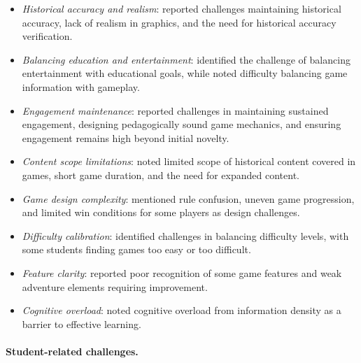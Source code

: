 \documentclass[a4paper,fleqn]{cas-sc}
\begin{document}
\begin{itemize}[noitemsep]
 \item \textit{Historical accuracy and realism}: \citet{1Barbatsis201159, 2Mahamarowi2023133, 25Repantis2011502} reported challenges maintaining historical accuracy, lack of realism in graphics, and the need for historical accuracy verification.
 
 \item \textit{Balancing education and entertainment}: \citet{71lynch2015pedagogical} identified the challenge of balancing entertainment with educational goals, while \citet{64Hsu201324} noted difficulty balancing game information with gameplay.
 
 \item \textit{Engagement maintenance}: \citet{1Barbatsis201159, 6Czerwinski2018, 60Hoy2018} reported challenges in maintaining sustained engagement, designing pedagogically sound game mechanics, and ensuring engagement remains high beyond initial novelty.
 
 \item \textit{Content scope limitations}: \citet{5kazanidis2018alpha, 13Humpire2022, 22Nugroho2020149, 41Petersen2023301} noted limited scope of historical content covered in games, short game duration, and the need for expanded content.
 
 \item \textit{Game design complexity}: \citet{71lynch2015pedagogical} mentioned rule confusion, uneven game progression, and limited win conditions for some players as design challenges.
 
 \item \textit{Difficulty calibration}: \citet{8Yu2014, 54Gibson2007, 60Hoy2018} identified challenges in balancing difficulty levels, with some students finding games too easy or too difficult.
 
 \item \textit{Feature clarity}: \citet{22Nugroho2020149} reported poor recognition of some game features and weak adventure elements requiring improvement.
 
 \item \textit{Cognitive overload}: \citet{52Lin2011265} noted cognitive overload from information density as a barrier to effective learning.
\end{itemize}

\paragraph{Student-related challenges.}
\end{document}
